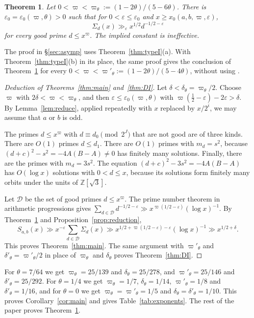 \documentclass[11pt]{amsart}
\newtheorem{theorem}{Theorem}[section]
\theoremstyle{remark}
\theoremstyle{definition}
\numberwithin{equation}{section}
\newcommand{\Dc}{\mathcal{D}}
\newcommand{\Z}{\mathbb{Z}}
\newcommand{\eps}{\varepsilon}
\begin{document}
\begin{theorem}\label{thm:Sigma}
Let $0<\varpi<\varpi_\theta:=(1-2\theta)/(5-6\theta)$. There is $\eps_0=\eps_0(\varpi,\theta)>0$ such that for $0<\eps\le\eps_0$ and $x\ge x_0(a,b,\varpi,\eps)$,
\[
\Sigma_d(x)\gg_\eps x^{1/2}d^{-1/2-\eps}
\]
for every good prime $d\le x^{\varpi}$. The implied constant is ineffective.
\end{theorem}

The proof in \S\ref{sec:asymp} uses Theorem~\ref{thm:typeI}(a). With Theorem~\ref{thm:typeI}(b) in its place, the same proof gives the conclusion of Theorem~\ref{thm:Sigma} for every $0<\varpi<\varpi'_\theta:=(1-2\theta)/(5-4\theta)$, without using \cite[Theorem~2]{Pas}.

\begin{proof}[Deduction of Theorems~\ref{thm:main} and~\ref{thm:DI}]
Let $\delta<\delta_\theta=\varpi_\theta/2$. Choose $\varpi$ with $2\delta<\varpi<\varpi_\theta$, and then $\eps\le\eps_0(\varpi,\theta)$ with $\varpi(\frac12-\eps)-2\eps>\delta$. By Lemma~\ref{lem:reduce}, applied repeatedly with $x$ replaced by $x/2^i$, we may assume that $a$ or $b$ is odd.

The primes $d\le x^{\varpi}$ with $d\equiv d_0\pmod{2^J}$ that are not good are of three kinds. There are $O(1)$ primes $d\le d_1$. There are $O(1)$ primes with $m_d=s^2$, because $(d+c)^2-s^2=-4A(B-A)\ne0$ has finitely many solutions. Finally, there are the primes with $m_d=3s^2$. The equation $(d+c)^2-3s^2=-4A(B-A)$ has $O(\log x)$ solutions with $0<d\le x$, because its solutions form finitely many orbits under the units of $\Z[\sqrt3]$.

Let $\Dc$ be the set of good primes $d\le x^{\varpi}$. The prime number theorem in arithmetic progressions gives $\sum_{d\in\Dc}d^{-1/2-\eps}\gg x^{\varpi(1/2-\eps)}(\log x)^{-1}$. By Theorem~\ref{thm:Sigma} and Proposition~\ref{prop:reduction},
\[
S_{a,b}(x)\gg x^{-\eps}\sum_{d\in\Dc}\Sigma_d(x)\gg x^{1/2+\varpi(1/2-\eps)-\eps}(\log x)^{-1}\gg x^{1/2+\delta}.
\]
This proves Theorem~\ref{thm:main}. The same argument with $\varpi'_\theta$ and $\delta'_\theta=\varpi'_\theta/2$ in place of $\varpi_\theta$ and $\delta_\theta$ proves Theorem~\ref{thm:DI}.
\end{proof}

For $\theta=7/64$ we get $\varpi_\theta=25/139$ and $\delta_\theta=25/278$, and $\varpi'_\theta=25/146$ and $\delta'_\theta=25/292$. For $\theta=1/4$ we get $\varpi_\theta=1/7$, $\delta_\theta=1/14$, $\varpi'_\theta=1/8$ and $\delta'_\theta=1/16$, and for $\theta=0$ we get $\varpi_\theta=\varpi'_\theta=1/5$ and $\delta_\theta=\delta'_\theta=1/10$. This proves Corollary~\ref{cor:main} and gives Table~\ref{tab:exponents}. The rest of the paper proves Theorem~\ref{thm:Sigma}.
\end{document}

